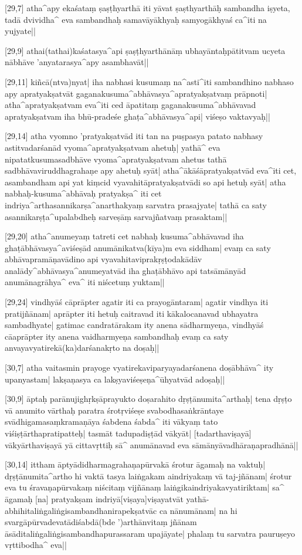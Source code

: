 [29,7] atha^apy ekaśataṃ ṣaṣṭhyarthā iti yāvat ṣaṣthyarthāḥ sambandha iṣyeta, tadā dvividha^ eva sambandhaḥ samavāyākhyaḥ samyogākhyaś ca^iti na yujyate||

[29,9] athai(tathai)kaśatasya^api ṣaṣṭhyarthānāṃ ubhayāntaḥpātitvam ucyeta nābhāve 'anyatarasya^apy asambhavāt||

[29,11] kiñcā(ntva)nyat| iha nabhasi kusumaṃ na^asti^iti sambandhino nabhaso apy apratyakṣatvāt gaganakusuma^abhāvasya^apratyakṣatvaṃ 
prāpnoti| atha^apratyakṣatvam eva^iti ced āpatitaṃ gaganakusuma^abhāvavad apratyakṣatvam iha bhū-pradeśe ghaṭa^abhāvasya^api| viśeṣo vaktavyaḥ||

[29,14] atha vyomno 'pratyakṣatvād iti tan na puṣpasya patato nabhasy astitvadarśanād vyoma^apratyakṣatvam ahetuḥ| yathā^ eva nipatatkusumasadbhāve vyoma^apratyakṣatvam ahetus tathā sadbhāvaviruddhagrahaṇe apy ahetuḥ syāt| atha^ākāśāpratyakṣatvād eva^iti cet, asambandham api yat kiṃcid vyavahitāpratyakṣatvādi so api hetuḥ syāt| atha nabhaḥ-kusuma^abhāvaḥ pratyakṣa^ iti cet indriya^arthasannikarṣa^anarthakyaṃ sarvatra prasajyate| tathā ca saty asannikarṣṭa^upalabdheḥ sarveṣāṃ sarvajñatvaṃ prasaktam||

[29,20] atha^anumeyaṃ tatreti cet nabhaḥ kusuma^abhāvavad iha ghaṭābhāvasya^aviśeṣād anumānikatva(kīya)m eva siddham| evaṃ ca saty abhāvapramāṇavādino api vyavahitaviprakṛṣṭodakādāv analādy^abhāvasya^anumeyatvād iha ghaṭābhāvo api tatsāmānyād anumānagrāhya^ eva^ iti niścetuṃ yuktam||

[29,24] vindhyāś cāprāpter agatir iti ca prayogāntaram| agatir vindhya iti pratijñānam| aprāpter iti hetuḥ caitravad iti kākalocanavad ubhayatra sambadhyate| gatimac candratārakam ity anena sādharmyeṇa, vindhyāś cāaprāpter ity anena vaidharmyeṇa sambandhaḥ evaṃ ca saty anvayavyatirekā(ka)darśanakṛto na doṣaḥ||

[30,7] atha vaitasmin prayoge vyatirekaviparyayadarśanena doṣābhāva^ ity upanyastam| lakṣaṇasya ca lakṣyaviśeṣeṇa^ūhyatvād adoṣaḥ|| 

[30,9] āptaḥ parānujighṛkṣāprayukto doṣarahito dṛṣṭānumita^arthaḥ| tena dṛṣṭo vā anumito vārthaḥ paratra śrotṛviśeṣe svabodhasaṅkrāntaye svādhigamasaṃkramaṇāya śabdena śabda^ iti vākyaṃ tato viśiṣṭārthapratipatteḥ| tasmāt tadupadiṣṭād vākyāt| [tadarthaviṣayā] vākyārthaviṣayā yā cittavṛttiḥ sā^ anumānavad eva sāmānyāvadhāraṇapradhānā||

[30,14] ittham āptyādidharmagrahaṇapūrvakā śrotur āgamaḥ na vaktuḥ| dṛṣṭānumita^artho hi vaktā tasya laiṅgakam aindriyakaṃ vā taj-jñānam| śrotur eva tu śravaṇapūrvakaṃ niścitaṃ vijñānaṃ laiṅgikaindriyakavyatiriktam| sa^ āgamaḥ [na] pratyakṣam indriyā[viṣaya]viṣayatvāt yathā-abhihitaliṅgaliṅgisambandhanirapekṣatvāc ca nānumānam| na hi svargāpūrvadevatādiśabdā(bde ')arthānvitaṃ jñānam āsāditaliṅgaliṅgisambandhapurassaram upajāyate| phalaṃ tu sarvatra 
pauruṣeyo vṛttibodha^ eva||

